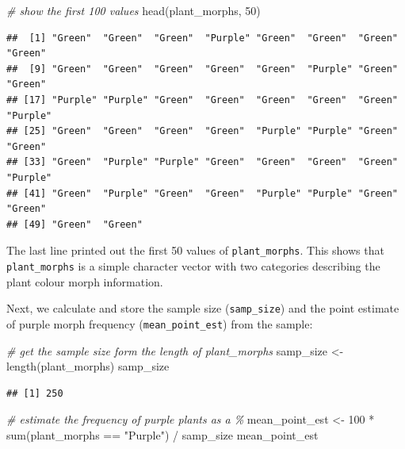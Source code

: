 \documentclass[
]{book}
\newenvironment{Shaded}{\begin{snugshade}}{\end{snugshade}}
\newcommand{\CommentTok}[1]{\textcolor[rgb]{0.56,0.35,0.01}{\textit{#1}}}
\newcommand{\DecValTok}[1]{\textcolor[rgb]{0.00,0.00,0.81}{#1}}
\newcommand{\FunctionTok}[1]{\textcolor[rgb]{0.00,0.00,0.00}{#1}}
\newcommand{\NormalTok}[1]{#1}
\newcommand{\OtherTok}[1]{\textcolor[rgb]{0.56,0.35,0.01}{#1}}
\newcommand{\SpecialCharTok}[1]{\textcolor[rgb]{0.00,0.00,0.00}{#1}}
\newcommand{\StringTok}[1]{\textcolor[rgb]{0.31,0.60,0.02}{#1}}
\begin{document}
\begin{Shaded}
\begin{Highlighting}[]
\CommentTok{\# show the first 100 values}
\FunctionTok{head}\NormalTok{(plant\_morphs, }\DecValTok{50}\NormalTok{) }
\end{Highlighting}
\end{Shaded}

\begin{verbatim}
##  [1] "Green"  "Green"  "Green"  "Purple" "Green"  "Green"  "Green"  "Green" 
##  [9] "Green"  "Green"  "Green"  "Green"  "Green"  "Purple" "Green"  "Green" 
## [17] "Purple" "Purple" "Green"  "Green"  "Green"  "Green"  "Green"  "Purple"
## [25] "Green"  "Green"  "Green"  "Green"  "Purple" "Purple" "Green"  "Green" 
## [33] "Green"  "Purple" "Purple" "Green"  "Green"  "Green"  "Green"  "Purple"
## [41] "Green"  "Purple" "Green"  "Green"  "Purple" "Purple" "Green"  "Green" 
## [49] "Green"  "Green"
\end{verbatim}

The last line printed out the first 50 values of \texttt{plant\_morphs}. This shows that \texttt{plant\_morphs} is a simple character vector with two categories describing the plant colour morph information.

Next, we calculate and store the sample size (\texttt{samp\_size}) and the point estimate of purple morph frequency (\texttt{mean\_point\_est}) from the sample:

\begin{Shaded}
\begin{Highlighting}[]
\CommentTok{\# get the sample size form the length of \textquotesingle{}plant\_morphs\textquotesingle{}}
\NormalTok{samp\_size }\OtherTok{\textless{}{-}} \FunctionTok{length}\NormalTok{(plant\_morphs)}
\NormalTok{samp\_size}
\end{Highlighting}
\end{Shaded}

\begin{verbatim}
## [1] 250
\end{verbatim}

\begin{Shaded}
\begin{Highlighting}[]
\CommentTok{\# estimate the frequency of purple plants as a \%}
\NormalTok{mean\_point\_est }\OtherTok{\textless{}{-}} \DecValTok{100} \SpecialCharTok{*} \FunctionTok{sum}\NormalTok{(plant\_morphs }\SpecialCharTok{==} \StringTok{"Purple"}\NormalTok{) }\SpecialCharTok{/}\NormalTok{ samp\_size}
\NormalTok{mean\_point\_est}
\end{Highlighting}
\end{Shaded}
\end{document}
